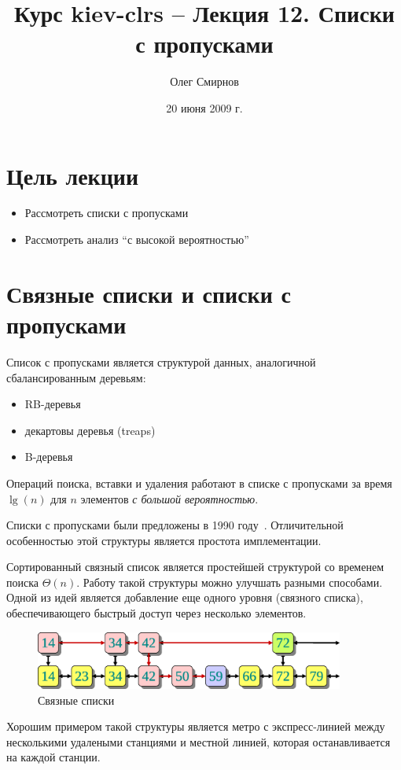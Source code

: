 \documentclass[11pt]{article}
\author{Олег Смирнов}
\title{Курс kiev-clrs -- Лекция 12. Списки с пропусками}
\date{20 июня 2009 г.}
\begin{document}
\maketitle
\tableofcontents

\newpage
\setlength{\parskip}{1ex plus 0.5ex minus 0.2ex}
\section{Цель лекции}
\begin{itemize}
\item Рассмотреть списки с пропусками
\item Рассмотреть анализ ``с высокой вероятностью''
\end{itemize}

\section{Связные списки и списки с пропусками}
Список с пропусками является структурой данных, аналогичной сбалансированным деревьям:
\begin{itemize}
\item RB-деревья
\item декартовы деревья (treaps)
\item B-деревья
\end{itemize}
Операций поиска, вставки и удаления работают в списке с пропусками за время $\lg(n)$ для $n$ элементов \emph{с большой вероятностью}.

Списки с пропусками были предложены в 1990 году~\cite{Pugh90skiplists}. Отличительной особенностью этой структуры является простота имплементации.

Сортированный связный список является простейшей структурой со временем поиска $\Theta(n)$. Работу такой структуры можно улучшать разными способами. Одной из идей является добавление еще одного уровня (связного списка), обеспечивающего быстрый доступ через несколько элементов.
\begin{figure}[ht]
  \centering
  \includegraphics[width=4in]{lecture12/linklists.eps}
  \caption{Связные списки}
  \label{fig:linklists}
\end{figure}
Хорошим примером такой структуры является метро с экспресс-линией между несколькими удалеными станциями и местной линией, которая останавливается на каждой станции.
\end{document}
